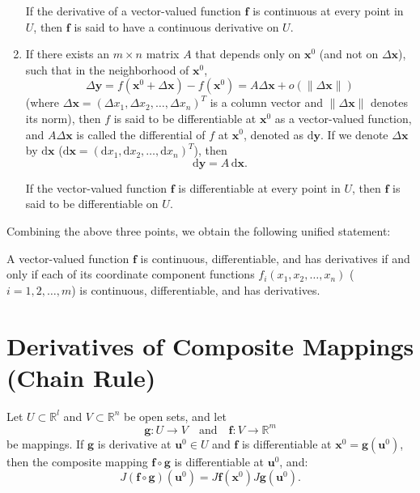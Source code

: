 \documentclass[11pt]{elegantbook}
\begin{document}
\begin{enumerate}
        If the derivative of a vector-valued function $\mathbf{f}$ is continuous at every point in $U$, 
        then $\mathbf{f}$ is said to have a continuous derivative on $U$.
    \item  If there exists an $m \times n$ matrix $A$ that depends only on $\mathbf{x}^0$ (and not on $\Delta \mathbf{x}$), 
        such that in the neighborhood of $\mathbf{x}^0$,
        \[
        \Delta \mathbf{y} = f(\mathbf{x}^0 + \Delta \mathbf{x}) - f(\mathbf{x}^0) = A \Delta \mathbf{x} + o(\|\Delta \mathbf{x}\|)
        \]
        (where $\Delta \mathbf{x} = (\Delta x_1, \Delta x_2, \dots, \Delta x_n)^T$ is a column vector and 
        $\|\Delta \mathbf{x}\|$ denotes its norm), 
        then $f$ is said to be differentiable at $\mathbf{x}^0$ as a vector-valued function, 
        and $A\Delta \mathbf{x}$ is called the differential of $f$ at $\mathbf{x}^0$, denoted as $\mathrm{d}\mathbf{y}$. 
        If we denote $\Delta \mathbf{x}$ by 
        $\mathrm{d}\mathbf{x}$ ($\mathrm{d}\mathbf{x} = (\mathrm{d}x_1, \mathrm{d}x_2, \dots, \mathrm{d}x_n)^T$), then
        \[
            \mathrm{d}\mathbf{y} = A\,\mathrm{d}\mathbf{x}.
        \]

        If the vector-valued function $\mathbf{f}$ is differentiable at every point in $U$, 
        then $\mathbf{f}$ is said to be differentiable on $U$.
\end{enumerate}

Combining the above three points, we obtain the following unified statement:

A vector-valued function \(\mathbf{f}\) is continuous, differentiable, 
and has derivatives if and only if each of its coordinate component functions 
\(f_i(x_1, x_2, \dots, x_n)\) (\(i = 1, 2, \dots, m\)) is continuous, differentiable, and has derivatives.


\section{Derivatives of Composite Mappings (Chain Rule)}
Let \( U \subset \mathbb{R}^l \) and \( V \subset \mathbb{R}^n \) be open sets, and let 
\[
\mathbf{g}: U \to V \quad \text{and} \quad \mathbf{f}: V \to \mathbb{R}^m
\]
be mappings. If \( \mathbf{g} \) is derivative at \( \mathbf{u}^{0} \in U \) 
and \( \mathbf{f} \) is differentiable at \( \mathbf{x}^{0} = \mathbf{g}(\mathbf{u}^{0}) \), 
then the composite mapping \( \mathbf{f} \circ \mathbf{g} \) is differentiable at \( \mathbf{u}^{0} \), and:
\[
J(\mathbf{f} \circ \mathbf{g})(\mathbf{u}^{0}) = 
J\mathbf{f}(\mathbf{x}^{0}) J\mathbf{g}(\mathbf{u}^{0}).
\]
\end{document}
